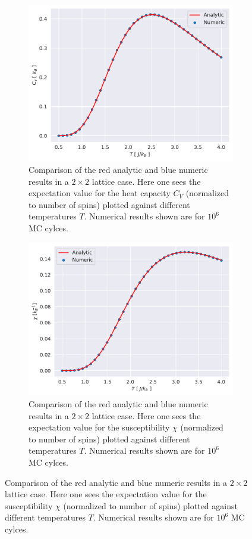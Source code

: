 \documentclass[english,notitlepage,reprint,nofootinbib]{revtex4-1}  %
\begin{document}
\begin{figure}[H]
    \begin{subfigure}{.5\textwidth}
        \centering
        \includegraphics[width=1\textwidth]{../figures/numeric_analytic_c_v_T.pdf}
        \caption{Comparison of the red analytic and blue numeric results in a $2\times2$ lattice case. Here one sees the expectation value for the heat capacity $C_V$ (normalized to number of spins) plotted against different temperatures $T$. Numerical results shown are for $10^6$ MC cylces.}
        \label{fig:numeric_analytic_c_v_T}
    \end{subfigure}

    \begin{subfigure}{.5\textwidth}
        \centering
        \includegraphics[width=1\textwidth]{../figures/numeric_analytic_X_T.pdf}
        \caption{Comparison of the red analytic and blue numeric results in a $2\times2$ lattice case. Here one sees the expectation value for the susceptibility $\chi$ (normalized to number of spins) plotted against different temperatures $T$. Numerical results shown are for $10^6$ MC cylces.}
        \label{fig:numeric_analytic_X_T}
    \end{subfigure}
\end{figure}
\end{document}
